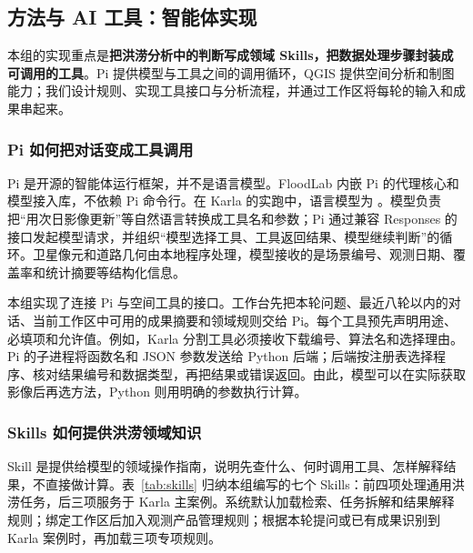


\subsection{方法与 AI 工具：智能体实现}
本组的实现重点是\textbf{把洪涝分析中的判断写成领域 Skills，把数据处理步骤封装成可调用的工具}。Pi 提供模型与工具之间的调用循环，QGIS 提供空间分析和制图能力；我们设计规则、实现工具接口与分析流程，并通过工作区将每轮的输入和成果串起来。

\subsubsection{Pi 如何把对话变成工具调用}
Pi 是开源的智能体运行框架\cite{pi}，并不是语言模型。FloodLab 内嵌 Pi 的代理核心和模型接入库，不依赖 Pi 命令行。在 Karla 的实跑中，语言模型为 。模型负责把“用次日影像更新”等自然语言转换成工具名和参数；Pi 通过兼容 Responses 的接口发起模型请求，并组织“模型选择工具、工具返回结果、模型继续判断”的循环。卫星像元和道路几何由本地程序处理，模型接收的是场景编号、观测日期、覆盖率和统计摘要等结构化信息。

本组实现了连接 Pi 与空间工具的接口。工作台先把本轮问题、最近八轮以内的对话、当前工作区中可用的成果摘要和领域规则交给 Pi。每个工具预先声明用途、必填项和允许值。例如，Karla 分割工具必须接收下载编号、算法名和选择理由。Pi 的子进程将函数名和 JSON 参数发送给 Python 后端；后端按注册表选择程序、核对结果编号和数据类型，再把结果或错误返回。由此，模型可以在实际获取影像后再选方法，Python 则用明确的参数执行计算。

\subsubsection{Skills 如何提供洪涝领域知识}
Skill 是提供给模型的领域操作指南，说明先查什么、何时调用工具、怎样解释结果，不直接做计算。表~\ref{tab:skills} 归纳本组编写的七个 Skills：前四项处理通用洪涝任务，后三项服务于 Karla 主案例。系统默认加载检索、任务拆解和结果解释规则；绑定工作区后加入观测产品管理规则；根据本轮提问或已有成果识别到 Karla 案例时，再加载三项专项规则。

